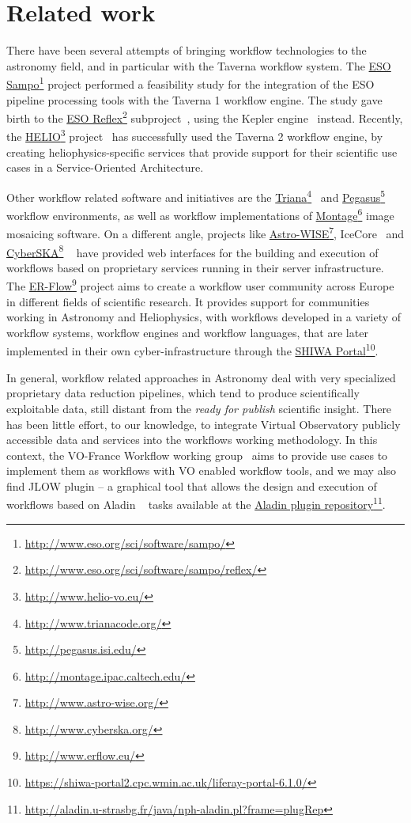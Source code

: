 \documentclass[final,authoryear,5p,times,twocolumn]{elsarticle}
\newcommand{\urlsamefont}[1]{\urlstyle{same}\url{#1}}
\newcommand{\hrefnote}[2]{\href{#1}{#2}\footnote{\urlsamefont{#1}}}
\begin{document}
\section{Related work}
\label{RelatedWork}

There have been several attempts of bringing workflow technologies to the astronomy field, and in particular with the Taverna workflow system. The \hrefnote{http://www.eso.org/sci/software/sampo/}{ESO Sampo} project performed a feasibility study for the integration of the ESO pipeline processing tools with the Taverna 1 workflow engine. The study gave birth to the \hrefnote{http://www.eso.org/sci/software/sampo/reflex/}{ESO Reflex} subproject~\citep{Hook2009}, using the Kepler engine~\citep{Altintas2004} instead. Recently, the \hrefnote{http://www.helio-vo.eu/}{HELIO} project~\citep{Bentley2013} has successfully used the Taverna 2 workflow engine, by creating heliophysics-specific services that provide support for their scientific use cases in a Service-Oriented Architecture. 

Other workflow related software and initiatives are the \hrefnote{http://www.trianacode.org/}{Triana}~\citep{Taylor2007} and \hrefnote{http://pegasus.isi.edu/}{Pegasus}~\citep{Deelman:2005:PFM:1239649.1239653} workflow environments, as well as workflow implementations of \hrefnote{http://montage.ipac.caltech.edu/}{Montage} image mosaicing software. On a different angle, projects like \hrefnote{http://www.astro-wise.org/}{Astro-WISE}, IceCore~\citep{Maisala2012} and \hrefnote{http://www.cyberska.org/}{CyberSKA} ~\citep{Kiddle2011} have provided web interfaces for the building and execution of workflows based on proprietary services running in their server infrastructure. The \hrefnote{http://www.erflow.eu/}{ER-Flow} project aims to create a workflow user community across Europe in different fields of scientific research. It provides support for communities working in Astronomy and Heliophysics, with workflows developed in a variety of workflow systems, workflow engines and workflow languages, that are later implemented in their own cyber-infrastructure through the \hrefnote{https://shiwa-portal2.cpc.wmin.ac.uk/liferay-portal-6.1.0/}{SHIWA Portal}.

In general, workflow related approaches in Astronomy deal with very specialized proprietary data reduction pipelines, which tend to produce scientifically exploitable data, still distant from the \textit{ready for publish} scientific insight. There has been little effort, to our knowledge, to integrate Virtual Observatory publicly accessible data and services into the workflows working methodology. In this context, the VO-France Workflow working group~\citep{Schaaff2008} aims to provide use cases to implement them as workflows with VO enabled workflow tools, and we may also find JLOW plugin -- a graphical tool that allows the design and execution of workflows based on Aladin ~\citep{Bonnarel2000} tasks available at the \hrefnote{http://aladin.u-strasbg.fr/java/nph-aladin.pl?frame=plugRep}{Aladin plugin repository}. 
\end{document}
